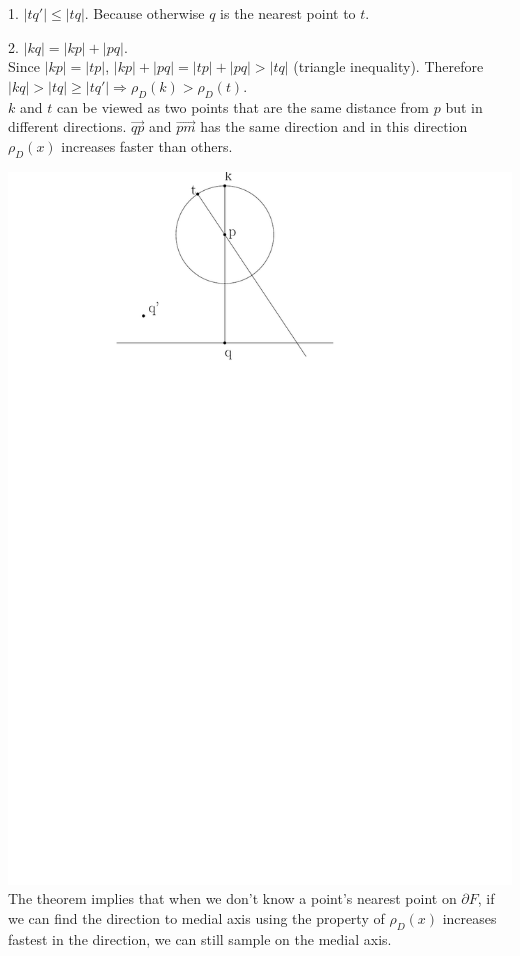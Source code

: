 \documentclass[12pt]{article}
\begin{document}
  1. $|tq'| \leq |tq|$. Because otherwise $q$ is the nearest point to $t$.
   
  2. $|kq| = |kp| + |pq|$. \\
  
  Since $|kp| = |tp|$, $|kp| + |pq| = |tp| + |pq| > |tq|$ (triangle inequality). Therefore $|kq| > |tq| \geq |tq'| \Longrightarrow \rho_{D}(k) > \rho_{D}(t)$. \\
  
  $k$ and $t$ can be viewed as two points that are the same distance from $p$ but in different directions. $\vec{qp}$ and $\vec{pm}$ has the same direction and in this direction $\rho_{D}(x)$ increases faster than others.
  
  \includegraphics[scale=1]{direction.pdf}\\
  
  The theorem implies that when we don't know a point's nearest point on $\partial F$, if we can find the direction to medial axis using the property of $\rho_{D}(x)$ increases fastest in the direction, we can still sample on the medial axis.\\
  
\end{document}

